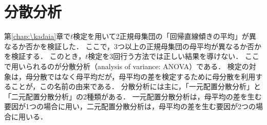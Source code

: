 \section{分散分析}
第\ref{chap:\kadaia}章で\(t\)検定を用いて2正規母集団の「回帰直線傾きの平均」が異なるか否かを検証した．
ここで，3つ以上の正規母集団の母平均が異なるか否かを検証する．
このとき，\(t\)検定を3回行う方法では正しい結果を導けない．
ここで用いられるのが分散分析（analysis of variance: ANOVA）である．
検定の対象は，母分散ではなく母平均だが，母平均の差を検定するために母分散を利用することが，この名前の由来である．
分散分析には主に，「一元配置分散分析」と「二元配置分散分析」の2種類がある．
一元配置分散分析は，母平均の差を生む要因が1つの場合に用い，二元配置分散分析は，母平均の差を生む要因が2つの場合に用いる．\\
\hfill\cite[p.170,\ p.179]{Rで学ぶ統計データ分析}